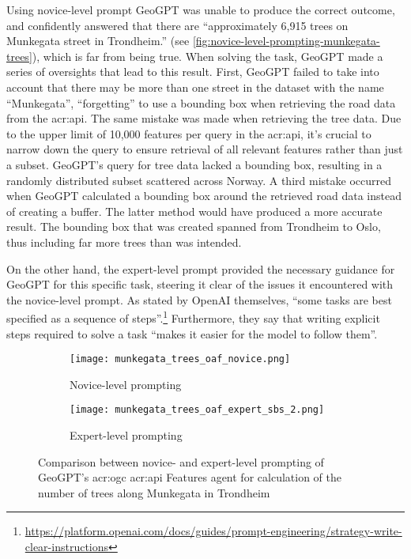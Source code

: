 Using novice-level prompt GeoGPT was unable to produce the correct outcome, and confidently answered that there are \enquote{approximately 6,915 trees on Munkegata street in Trondheim.} (see \autoref{fig:novice-level-prompting-munkegata-trees}), which is far from being true. When solving the task, GeoGPT made a series of oversights that lead to this result. First, GeoGPT failed to take into account that there may be more than one street in the dataset with the name \enquote{Munkegata}, \enquote{forgetting} to use a bounding box when retrieving the road data from the \acrshort{acr:api}. The same mistake was made when retrieving the tree data. Due to the upper limit of 10,000 features per query in the \acrshort{acr:api}, it's crucial to narrow down the query to ensure retrieval of all relevant features rather than just a subset. GeoGPT's query for tree data lacked a bounding box, resulting in a randomly distributed subset scattered across Norway. A third mistake occurred when GeoGPT calculated a bounding box around the retrieved road data instead of creating a buffer. The latter method would have produced a more accurate result. The bounding box that was created spanned from Trondheim to Oslo, thus including far more trees than was intended.

On the other hand, the expert-level prompt provided the necessary guidance for GeoGPT for this specific task, steering it clear of the issues it encountered with the novice-level prompt. As stated by OpenAI themselves, \enquote{some tasks are best specified as a sequence of steps}.\footnote{\url{https://platform.openai.com/docs/guides/prompt-engineering/strategy-write-clear-instructions}} Furthermore, they say that writing explicit steps required to solve a task \enquote{makes it easier for the model to follow them}.

\begin{figure}[htbp]
    \centering
    \begin{subfigure}[b]{0.7\textwidth}
        \centering
        \texttt{[image: munkegata\_trees\_oaf\_novice.png]}
        \caption{Novice-level prompting}
        \label{fig:novice-level-prompting-munkegata-trees}
    \end{subfigure}
    \hfill
    \begin{subfigure}[b]{0.7\textwidth}
        \centering
        \texttt{[image: munkegata\_trees\_oaf\_expert\_sbs\_2.png]}
        \caption{Expert-level prompting}
        \label{fig:expert-level-prompting-munkegata-trees}
    \end{subfigure}
    \caption{Comparison between novice- and expert-level prompting of GeoGPT's \acrshort{acr:ogc} \acrshort{acr:api} Features agent for calculation of the number of trees along Munkegata in Trondheim}
    \label{fig:novice-vs-expert-munkegata-trees}
\end{figure}

